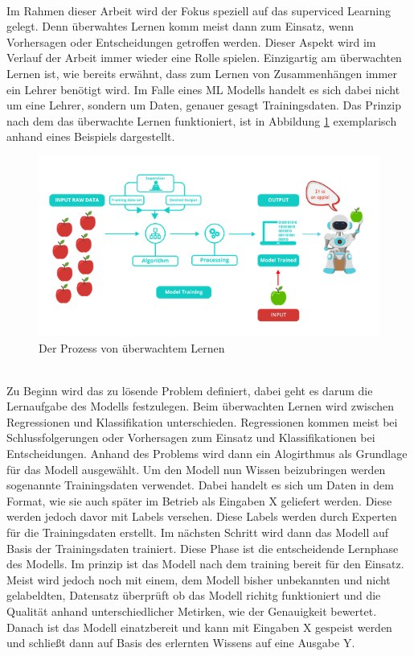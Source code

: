 \begin{onehalfspace}
        \\
        Im Rahmen dieser Arbeit wird der Fokus speziell auf das superviced Learning gelegt. Denn überwahtes Lernen komm meist dann zum Einsatz, wenn Vorhersagen oder Entscheidungen getroffen werden. Dieser Aspekt wird im Verlauf der Arbeit immer wieder eine Rolle spielen. Einzigartig am überwachten Lernen ist, wie bereits erwähnt, dass zum Lernen von Zusammenhängen immer ein \glqq{}Lehrer\grqq{} benötigt wird. Im Falle eines \ac{ML} Modells handelt es sich dabei nicht um eine Lehrer, sondern um Daten, genauer gesagt Trainingsdaten.
        Das Prinzip nach dem das überwachte Lernen funktioniert, ist in Abbildung \ref*{fig:learningProcess} exemplarisch anhand eines Beispiels dargestellt.
        \begin{figure}[h]
            \centering
            \includegraphics[width = 14cm]{Bilder/superviced_learning.png}
            \caption{Der Prozess von überwachtem Lernen \cite{Kharwal2020}}
            \label{fig:learningProcess}
        \end{figure}
        \\
        Zu Beginn wird das zu lösende Problem definiert, dabei geht es darum die Lernaufgabe des Modells festzulegen. Beim überwachten Lernen wird zwischen Regressionen und Klassifikation unterschieden. Regressionen kommen meist bei Schlussfolgerungen oder Vorhersagen zum Einsatz und Klassifikationen bei Entscheidungen. 
        Anhand des Problems wird dann ein Alogirthmus als Grundlage für das Modell ausgewählt. Um den Modell nun Wissen beizubringen werden sogenannte Trainingsdaten verwendet. Dabei handelt es sich um Daten in dem Format, wie sie auch später im Betrieb als Eingaben X geliefert werden. Diese werden jedoch davor mit Labels versehen. Diese Labels werden durch Experten für die Trainingsdaten erstellt. Im nächsten Schritt wird dann das Modell auf Basis der Trainingsdaten trainiert. Diese Phase ist die entscheidende Lernphase des Modells. Im prinzip ist das Modell nach dem training bereit für den Einsatz. Meist wird jedoch noch mit einem, dem Modell bisher unbekannten und nicht gelabeldten, Datensatz überprüft ob das Modell richitg funktioniert und die Qualität anhand unterschiedlicher Metirken, wie der Genauigkeit bewertet. Danach ist das Modell einatzbereit und kann mit Eingaben X gespeist werden und schließt dann auf Basis des erlernten Wissens auf eine Ausgabe Y. \cite{Horn2022}\cite{Döbel2018}

\end{onehalfspace}
